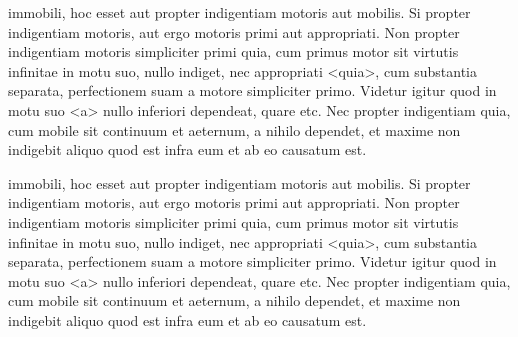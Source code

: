 \documentclass[12pt]{article}
\begin{document}
\pstart 
immobili, hoc esset aut propter indigentiam motoris aut mobilis. Si
propter indigentiam motoris, aut ergo  motoris primi aut
appropriati. Non propter indigentiam motoris simpliciter primi quia,
cum primus motor sit virtutis infinitae in motu suo, nullo indiget,
nec appropriati <quia>, cum 
substantia separata, perfectionem suam
 a motore simpliciter
primo. Videtur igitur quod in motu suo <a> nullo inferiori dependeat,
quare etc. Nec propter indigentiam  quia, cum mobile sit continuum et aeternum, a nihilo dependet,
et maxime non indigebit aliquo quod est infra eum et ab eo causatum
est.  
\pend

\pstart 
immobili, hoc esset aut propter indigentiam motoris aut mobilis. Si
propter indigentiam motoris, aut ergo  motoris primi aut
appropriati. Non propter indigentiam motoris simpliciter primi quia,
cum primus motor sit virtutis infinitae in motu suo, nullo indiget,
nec appropriati <quia>, cum 
substantia separata, perfectionem suam
 a motore simpliciter
primo. Videtur igitur quod in motu suo <a> nullo inferiori dependeat,
quare etc. Nec propter indigentiam  quia, cum mobile sit continuum et aeternum, a nihilo dependet,
et maxime non indigebit aliquo quod est infra eum et ab eo causatum
est.  
\pend


\endnumbering
\end{document}
